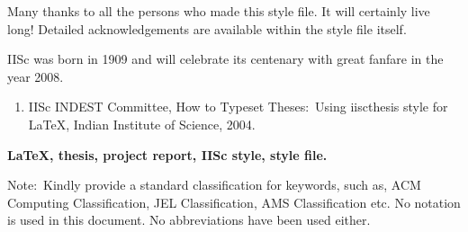 \begin{frontmatter}
Many thanks to all the persons who made this style file. It will certainly
live long! Detailed acknowledgements are available within the style file itself.

\vita
IISc was born in 1909 and will celebrate its centenary with great fanfare
in the year 2008.
\publications

\begin{enumerate}
\item IISc INDEST Committee,  How to Typeset Theses:~Using iiscthesis
style for \LaTeX, Indian Institute of Science, 2004.
\end{enumerate}

\begin{abstract}
\sl
	This manual tells   you how  to use the  {\tt iiscthes} style to
produce professional  theses (Ph.D., M.Sc.(Engg)  or  M.E.   reports).
This style is a modification of the  standard \LaTeX\ report style. 
This document is written using the {\tt iiscthes} style itself.
	
\end{abstract}

\makecontents

\keywords
{\large\bf{
LaTeX, thesis, project report, IISc style, style file.
}}

\vspace{10MM}

\noindent
Note:~Kindly provide a standard classification for keywords, such as,
ACM Computing Classification, JEL Classification, AMS Classification etc.
\notations
	No notation is used in this document. No abbreviations have been
used either.
\end{frontmatter}


